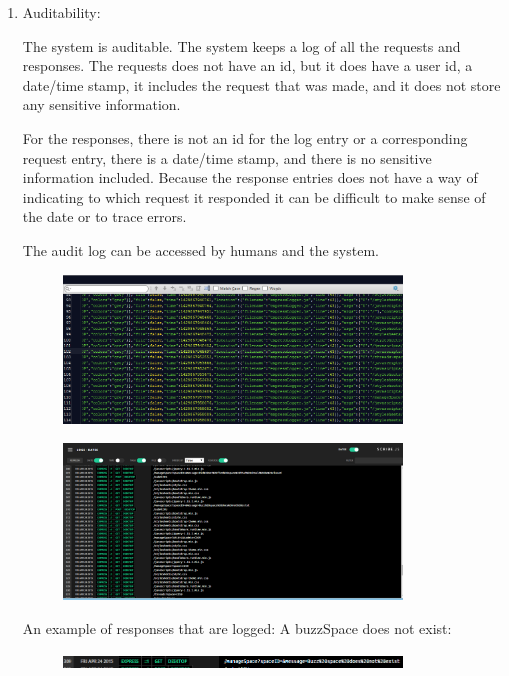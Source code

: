 \documentclass[hidelinks, 12pt, oneside]{article}
\begin{document}
\begin{enumerate}
\item Auditability:

The system is auditable. 
The system keeps a log of all the requests and responses. The requests does not have an id, but it does have a user id, a date/time stamp, it includes the request that was made, and it does not store any sensitive information.

For the responses, there is not an id for the log entry or a corresponding request entry, there is a date/time stamp, and there is no sensitive information included. Because the response entries does not have a way of indicating to which request it responded it can be difficult to make sense of the date or to trace errors.

The audit log can be accessed by humans and the system. 


\begin{figure}[h!]
  \centering
    \includegraphics[width=0.85\textwidth]{logFile} 
\end{figure}

\begin{figure}[h!]
  \centering
    \includegraphics[width=0.85\textwidth]{logs} 
\end{figure}

An example of responses that are logged:
A buzzSpace does not exist:

\begin{figure}[h!]
  \centering
    \includegraphics[width=0.85\textwidth]{buzzNotExistLog} 
\end{figure}


\end{enumerate}
\end{document}
